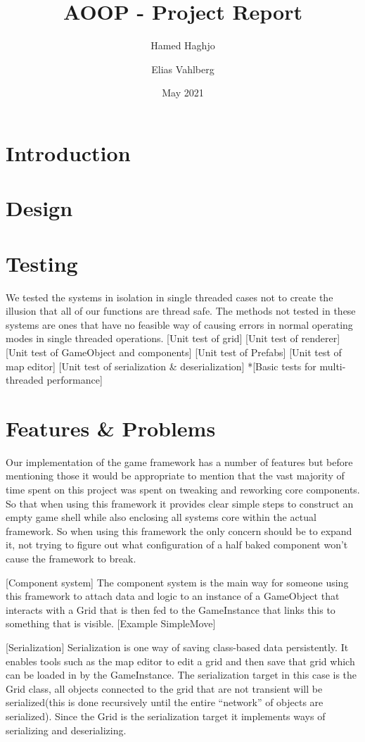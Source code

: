 \documentclass{article}
\title{AOOP - Project Report}
\author{Hamed Haghjo \and Elias Vahlberg}
\date{May 2021}
\begin{document}
\maketitle
\tableofcontents
\newpage
\section{Introduction}

\newpage
\section{Design}

\newpage
\section{Testing}
We tested the systems in isolation in single threaded cases  not to create the illusion that all of our functions are thread safe.
The methods not tested in these systems are ones that have no feasible way of causing errors in normal operating modes in single threaded operations.
[Unit test of grid]
[Unit test of renderer]
[Unit test of GameObject and components]
[Unit test of Prefabs]
[Unit test of map editor]
[Unit test of serialization \& deserialization]
*[Basic tests for multi-threaded performance]

\newpage
\section{Features \& Problems}
Our implementation of the game framework has a number of features but before mentioning those it would be appropriate to mention that the vast majority of time spent on this project was spent on tweaking and reworking core components. So that when using this framework it provides clear simple steps to construct an empty game shell while also enclosing all systems core within the actual framework. So when using this framework the only concern should be to expand it, not trying to figure out what configuration of a half baked component won’t cause the framework to break.

[Component system]
The component system is the main way for someone using this framework to attach data and logic to an instance of a GameObject that interacts with a Grid that is then fed to the GameInstance that links this to something that is visible.
[Example SimpleMove]

[Serialization]
Serialization is one way of saving class-based data persistently.  It enables tools such as the map editor to edit a grid and then save that grid which can be loaded in by the GameInstance. The serialization target in this case is the Grid class, all objects connected to the grid that are not transient will be serialized(this is done recursively until the entire “network”  of objects are serialized). Since the Grid is the serialization target it  implements ways of serializing and deserializing. 
\end{document}
